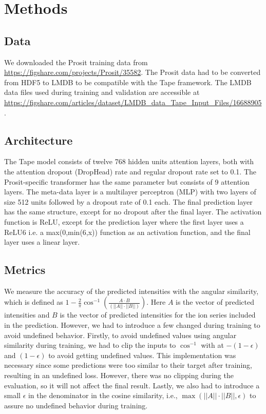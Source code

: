 \documentclass[10pt,a4paper]{article}
\begin{document}
\section*{Methods}
\subsection*{Data}
We downloaded the Prosit training data from \url{https://figshare.com/projects/Prosit/35582}. The Prosit data had to be converted from HDF5 to LMDB to be compatible with the Tape framework. The LMDB data files used during training and validation are accessible at \url{https://figshare.com/articles/dataset/LMDB_data_Tape_Input_Files/16688905}.

\subsection*{Architecture}

The Tape model consists of twelve 768 hidden units attention layers, both with the attention dropout (DropHead) rate \cite{Zhou2020-ji} and regular dropout rate set to 0.1. The Prosit-specific transformer has the same parameter but consists of 9 attention layers. The meta-data layer is a multilayer perceptron (MLP) with two layers of size 512 units followed by a dropout rate of 0.1 each. The final prediction layer has the same structure, except for no dropout after the final layer.  The activation function is ReLU, except for the prediction layer where the first layer uses a ReLU6 \cite{Howard2017-yv} i.e. a max(0,min(6,x)) function as an activation function, and the final layer uses a linear layer.



\subsection*{Metrics}

We measure the accuracy of the predicted intensities with the angular similarity, which is defined as $1-\frac{2}{\pi} \cos^{-1}\left(\frac{A \cdot B}{(||A||\cdot||B||)}\right)$. Here $A$ is the vector of predicted intensities and $B$ is the vector of predicted intensities for the ion series included in the prediction. However, we had to introduce a few changed during training to avoid undefined behavior. Firstly, to avoid undefined values using angular similarity during training, we had to clip the inputs to $\cos^{-1}$ with at $-(1-\epsilon)$ and $(1-\epsilon)$ to avoid getting undefined values. This implementation was necessary since some predictions were too similar to their target after training, resulting in an undefined loss. However, there was no clipping during the evaluation, so it will not affect the final result. Lastly, we also had to introduce a small $\epsilon$ in the denominator in the cosine similarity, i.e., $\max(||A||·||B||, \epsilon)$ to assure no undefined behavior during training.
\end{document}
